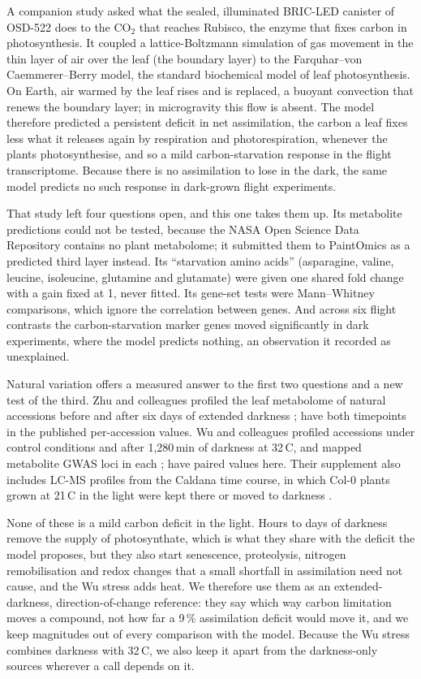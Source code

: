 \documentclass{npjlayout}
\begin{document}
A companion study \citep{firststudy} asked what the sealed, illuminated BRIC-LED canister of
OSD-522 \citep{osd522} does to the CO$_2$ that reaches Rubisco, the enzyme that fixes carbon in
photosynthesis. It coupled a lattice-Boltzmann simulation of gas movement in the thin layer of air
over the leaf (the boundary layer) to the Farquhar--von Caemmerer--Berry model, the standard
biochemical model of leaf photosynthesis. On Earth, air warmed by the leaf rises and is replaced, a
buoyant convection that renews the boundary layer; in microgravity this flow is absent. The model
therefore predicted a persistent deficit in net assimilation, the carbon a leaf fixes less what it
releases again by respiration and photorespiration, whenever the plants photosynthesise, and so a
mild carbon-starvation response in the flight transcriptome. Because there is no assimilation to
lose in the dark, the same model predicts no such response in dark-grown flight experiments.

That study left four questions open, and this one takes them up. Its metabolite predictions could not be tested, because the NASA
Open Science Data Repository \citep{osdr2025} contains no plant metabolome; it submitted them to
PaintOmics \citep{paintomics4} as a predicted third layer instead. Its ``starvation amino acids''
(asparagine, valine, leucine, isoleucine, glutamine and glutamate) were given one shared fold change
with a gain fixed at 1, never fitted. Its gene-set tests were Mann--Whitney comparisons, which
ignore the correlation between genes. And across six flight contrasts the carbon-starvation marker
genes moved significantly in dark experiments, where the model predicts nothing, an observation it
recorded as unexplained.

Natural variation offers a measured answer to the first two questions and a new test of the third.
Zhu and colleagues profiled the leaf metabolome of natural accessions before and after six days of
extended darkness \citep{zhu2022,zhu2024}; \nZhuAcc{} have both timepoints in the published
per-accession values. Wu and colleagues profiled accessions under control conditions and after
1{,}280\,min of darkness at 32\,\textdegree C, and mapped metabolite GWAS loci in each
\citep{wu2018}; \nWuAcc{} have paired values here. Their supplement also includes LC-MS profiles
from the Caldana time course, in which Col-0 plants grown at 21\,\textdegree C in the light were
kept there or moved to darkness \citep{caldana2011,wu2018}.

None of these is a mild carbon deficit in the light. Hours to days of darkness remove the supply of
photosynthate, which is what they share with the deficit the model proposes, but they also start
senescence, proteolysis, nitrogen remobilisation and redox changes that a small shortfall in
assimilation need not cause, and the Wu stress adds heat. We therefore use them as an
extended-darkness, direction-of-change reference: they say which way carbon limitation moves a
compound, not how far a 9\,\% assimilation deficit would move it, and we keep magnitudes out of
every comparison with the model. Because the Wu stress combines darkness with 32\,\textdegree C, we
also keep it apart from the darkness-only sources wherever a call depends on it.
\end{document}
